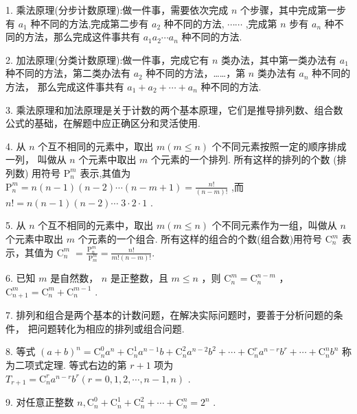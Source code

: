 \documentclass[10pt]{article}
\begin{document}
1. 乘法原理(分步计数原理):做一件事，需要依次完成 \(n\) 个步骤，其中完成第一步有 \({a}_{1}\) 种不同的方法,完成第二步有 \({a}_{2}\) 种不同的方法, \(\cdots \cdots\) ,完成第 \(n\) 步有 \({a}_{n}\) 种不同的方法，那么完成这件事共有 \({a}_{1}{a}_{2}\cdots {a}_{n}\) 种不同的方法.

2. 加法原理(分类计数原理):做一件事，完成它有 \(n\) 类办法，其中第一类办法有 \({a}_{1}\) 种不同的方法，第二类办法有 \({a}_{2}\) 种不同的方法，……，第 \(n\) 类办法有 \({a}_{n}\) 种不同的方法， 那么完成这件事共有 \({a}_{1} + {a}_{2} + \cdots  + {a}_{n}\) 种不同的方法.

3. 乘法原理和加法原理是关于计数的两个基本原理，它们是推导排列数、组合数公式的基础，在解题中应正确区分和灵活使用.

4. 从 \(n\) 个互不相同的元素中，取出 \(m\left( {m \leq  n}\right)\) 个不同元素按照一定的顺序排成一列， 叫做从 \(n\) 个元素中取出 \(m\) 个元素的一个排列. 所有这样的排列的个数 (排列数) 用符号 \({\mathrm{P}}_{n}^{m}\) 表示,其值为 \({\mathrm{P}}_{n}^{m} = n\left( {n - 1}\right) \left( {n - 2}\right) \cdots \left( {n - m + 1}\right)  = \frac{n!}{\left( {n - m}\right) !}\) ,而 \(n! = n\left( {n - 1}\right) \left( {n - 2}\right) \cdots \; 3 \cdot  2 \cdot  1\) .

5. 从 \(n\) 个互不相同的元素中，取出 \(m\left( {m \leq  n}\right)\) 个不同元素作为一组，叫做从 \(n\) 个元素中取出 \(m\) 个元素的一个组合. 所有这样的组合的个数(组合数)用符号 \({\mathrm{C}}_{n}^{m}\) 表示，其值为 \({\mathrm{C}}_{n}^{m} \; = \frac{{\mathrm{P}}_{n}^{m}}{{\mathrm{\;P}}_{m}^{m}} = \frac{n!}{m!\left( {n - m}\right) !}.\)

6. 已知 \(m\) 是自然数， \(n\) 是正整数，且 \(m \leq  n\) ，则 \({\mathrm{C}}_{n}^{m} = {\mathrm{C}}_{n}^{n - m}\) ， \({\mathrm{C}}_{n + 1}^{m} = {\mathrm{C}}_{n}^{m} + {\mathrm{C}}_{n}^{m - 1}\) .

7. 排列和组合是两个基本的计数问题，在解决实际问题时，要善于分析问题的条件， 把问题转化为相应的排列或组合问题.

8. 等式 \({\left( a + b\right) }^{n} = {\mathrm{C}}_{n}^{0}{a}^{n} + {\mathrm{C}}_{n}^{1}{a}^{n - 1}b + {\mathrm{C}}_{n}^{2}{a}^{n - 2}{b}^{2} + \cdots  + {\mathrm{C}}_{n}^{r}{a}^{n - r}{b}^{r} + \cdots  + {\mathrm{C}}_{n}^{n}{b}^{n}\) 称为二项式定理. 等式右边的第 \(r + 1\) 项为 \({T}_{r + 1} = {\mathrm{C}}_{n}^{r}{a}^{n - r}{b}^{r}\left( {r = 0,1,2,\cdots ,n - 1,n}\right)\) .

9. 对任意正整数 \(n,{\mathrm{C}}_{n}^{0} + {\mathrm{C}}_{n}^{1} + {\mathrm{C}}_{n}^{2} + \cdots  + {\mathrm{C}}_{n}^{n} = {2}^{n}\) .
\end{document}
